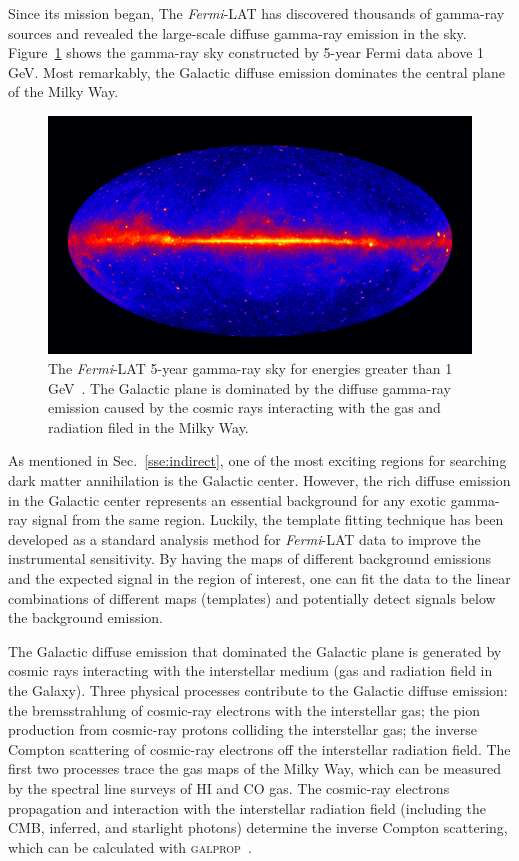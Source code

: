 \documentclass[doublespace,nopageskip]{VTthesis} %
\begin{document}
Since its mission began, The \textit{Fermi}-LAT has discovered thousands of gamma-ray sources and revealed the large-scale diffuse gamma-ray emission in the sky. Figure~\ref{fig:gamma_sky} shows the gamma-ray sky constructed by 5-year Fermi data above 1 GeV. Most remarkably, the Galactic diffuse emission dominates the central plane of the Milky Way.

\begin{figure}[htb]
    \centering
    \includegraphics[width=1\textwidth]{Figures/Intro/Femri_5_year_2500x1407.jpg}
    \caption{The \textit{Fermi}-LAT 5-year gamma-ray sky for energies greater than 1 GeV~\cite{NASAs2013}. The Galactic plane is dominated by the diffuse gamma-ray emission caused by the cosmic rays interacting with the gas and radiation filed in the Milky Way.}
    \label{fig:gamma_sky}
\end{figure}

As mentioned in Sec.~\ref{sse:indirect}, one of the most exciting regions for searching dark matter annihilation is the Galactic center. However, the rich diffuse emission in the Galactic center represents an essential background for any exotic gamma-ray signal from the same region. Luckily, the template fitting technique has been developed as a standard analysis method for \textit{Fermi}-LAT data to improve the instrumental sensitivity. By having the maps of different background emissions and the expected signal in the region of interest, one can fit the data to the linear combinations of different maps (templates) and potentially detect signals below the background emission.

The Galactic diffuse emission that dominated the Galactic plane is generated by cosmic rays interacting with the interstellar medium (gas and radiation field in the Galaxy). Three physical processes contribute to the Galactic diffuse emission: the bremsstrahlung of cosmic-ray electrons with the interstellar gas; the pion production from cosmic-ray protons colliding the interstellar gas; the inverse Compton scattering of cosmic-ray electrons off the interstellar radiation field. The first two processes trace the gas maps of the Milky Way, which can be measured by the spectral line surveys of HI and CO gas. The cosmic-ray electrons propagation and interaction with the interstellar radiation field (including the CMB, inferred, and starlight photons) determine the inverse Compton scattering, which can be calculated with \textsc{galprop}~\cite{2017ApJ...846...67P}.
\end{document}
